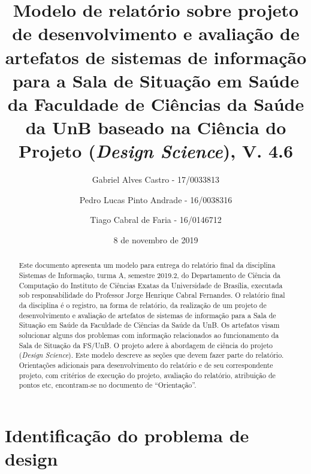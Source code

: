 \documentclass[12pt]{article}
\newcommand{\rascbegin}{\color{red}}    %
\newcommand{\rascend}{\color{black}}    %
\begin{document}
	
	\title{Modelo de relatório sobre projeto de desenvolvimento e avaliação de artefatos de sistemas de informação para a Sala de Situação em Saúde da Faculdade de Ciências da Saúde da UnB baseado na Ciência do Projeto (\textit{Design Science}), V. 4.6}
	
	
	
	\author{Gabriel Alves Castro - 17/0033813 \and Pedro Lucas Pinto Andrade - 16/0038316 \and Tiago Cabral de Faria - 16/0146712}
	
	\date{8 de novembro de 2019}
	
	\maketitle
	\tableofcontents
	\listoffigures
	\listoftables
	\printnoidxglossary
	
	
	
	
	\begin{abstract}
		\rascbegin
		Este documento apresenta um modelo para entrega do relatório final da disciplina Sistemas de Informação, turma A, semestre 2019.2, do Departamento de Ciência da Computação do Instituto de Ciências Exatas da Universidade de Brasília, executada sob responsabilidade do Professor Jorge Henrique Cabral Fernandes. 
		O relatório final da disciplina é o registro, na forma de relatório, da realização de um projeto de desenvolvimento e avaliação de artefatos de sistemas de informação para a Sala de Situação em Saúde da Faculdade de Ciências da Saúde da UnB. 
		Os artefatos visam solucionar alguns dos problemas com informação relacionados ao funcionamento da Sala de Situação da FS/UnB.
		O projeto adere à abordagem de ciência do projeto (\textit{Design Science}). 
		Este modelo descreve as seções que devem fazer parte do relatório.
		Orientações adicionais para desenvolvimento do relatório e de seu correspondente projeto, com critérios de execução do projeto, avaliação do relatório, atribuição de pontos etc, encontram-se no docu\-mento de ``Orientação''.
		\rascend
	\end{abstract}	
	
	
	\section{Identificação do problema de design\label{Sec:CP:IdentifProblema}}
	
\end{document}

